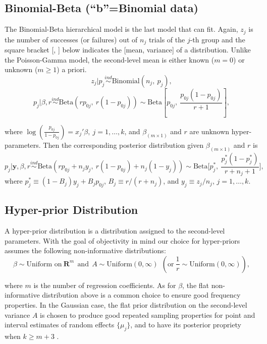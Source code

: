 \documentclass[article]{jss}
\begin{document}
\subsection[Binomial-Beta]{Binomial-Beta (``b''=Binomial data)}
The Binomial-Beta hierarchical model is the last model that  can fit. Again, $z_{j}$ is the number of successes (or failures) out of $n_{j}$ trials of the $j$-th group and the square bracket [, ] below indicates the [mean, variance] of a distribution. Unlike the Poisson-Gamma model, the second-level mean is either known ($m=0$) or unknown ($m\ge1$) a priori.
\begin{equation}
z_{j} \vert p_{j}\stackrel{ind}{\sim}\textrm{Binomial}(n_{j}, ~p_{j}),
\end{equation}
\begin{equation}
p_{j} \vert \beta, r\stackrel{ind}{\sim}\textrm{Beta}(rp_{0j},~ r(1-p_{0j}))\sim \textrm{Beta} \left[p_{0j}, ~\frac{p_{0j}(1-p_{0j})}{r + 1} \right],
\end{equation}

where $\log(\frac{p_{0j}}{1-p_{0j}}) =x_{j}'\beta, ~j=1, \ldots, k$, and $\beta_{(m\times1)}$ and $r$ are unknown hyper-parameters. Then the corresponding posterior distribution given  $\beta_{(m\times1)}$ and $r$ is
\begin{equation} \label{betapost}
p_{j}\vert \textbf{y}, \beta, r \stackrel{ind}{\sim}\textrm{Beta}(rp_{0j}+n_{j}y_{j},~r(1-p_{0j})+n_{j}(1-y_{j}))\sim\textrm{Beta}\bigg[p^{\ast}_{j},~ \frac{p^{\ast}_{j}(1-p^{\ast}_{j})}{r+n_{j}+1}\bigg],
\end{equation}
where $p^{\ast}_{j}\equiv(1-B_{j})y_{j}+B_{j}p_{0j}$, $B_{j}\equiv r/ (r+n_{j})$, and $y_{j}\equiv z_{j} / n_{j}$, $j=1,\ldots,k$.


\subsection[Hyper-prior Distribution]{Hyper-prior Distribution}
A hyper-prior distribution is a distribution assigned to the second-level parameters. With the goal of objectivity in mind our choice for hyper-priors assumes the following non-informative distributions:
\begin{equation}
  \label{eq:hyper}
\beta \sim \textrm{Uniform on}~ \mathbf{R}^{m}~~\textrm{and}~~A \sim \textrm{Uniform}(0, \infty) ~~(\textrm{or} ~\frac{1}{r}\sim \textrm{Uniform}(0, \infty)),
\end{equation}

where $m$ is the number of regression coefficients. As for $\beta$, the flat non-informative distribution above is a common choice to ensure good frequency properties. In the Gaussian case, the flat prior distribution on the second-level variance $A$ is chosen to produce good repeated sampling properties for point and interval estimates of random effects $\{\mu_{j}\}$, and to have its posterior propriety when $k\ge m+3$ \citep{2011}. 
\end{document}
